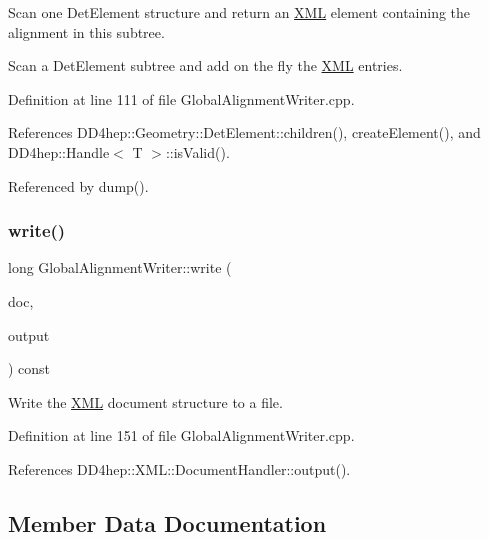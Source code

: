 Scan one Det\+Element structure and return an \hyperlink{namespace_d_d4hep_1_1_x_m_l}{X\+ML} element containing the alignment in this subtree. 

Scan a Det\+Element subtree and add on the fly the \hyperlink{namespace_d_d4hep_1_1_x_m_l}{X\+ML} entries. 

Definition at line 111 of file Global\+Alignment\+Writer.\+cpp.



References D\+D4hep\+::\+Geometry\+::\+Det\+Element\+::children(), create\+Element(), and D\+D4hep\+::\+Handle$<$ T $>$\+::is\+Valid().



Referenced by dump().

\hypertarget{class_d_d4hep_1_1_alignments_1_1_global_alignment_writer_aabe76e2b9db559cbf871294036517567}{}\label{class_d_d4hep_1_1_alignments_1_1_global_alignment_writer_aabe76e2b9db559cbf871294036517567} 
\subsubsection{\texorpdfstring{write()}{write()}}
{\footnotesize\ttfamily long Global\+Alignment\+Writer\+::write (\begin{DoxyParamCaption}\item[{\hyperlink{class_d_d4hep_1_1_x_m_l_1_1_document}{X\+M\+L\+::\+Document}}]{doc,  }\item[{const std\+::string \&}]{output }\end{DoxyParamCaption}) const}



Write the \hyperlink{namespace_d_d4hep_1_1_x_m_l}{X\+ML} document structure to a file. 



Definition at line 151 of file Global\+Alignment\+Writer.\+cpp.



References D\+D4hep\+::\+X\+M\+L\+::\+Document\+Handler\+::output().



\subsection{Member Data Documentation}
\hypertarget{class_d_d4hep_1_1_alignments_1_1_global_alignment_writer_a467b49352cf36fef9e92b1dfa407edec}{}\label{class_d_d4hep_1_1_alignments_1_1_global_alignment_writer_a467b49352cf36fef9e92b1dfa407edec} 
